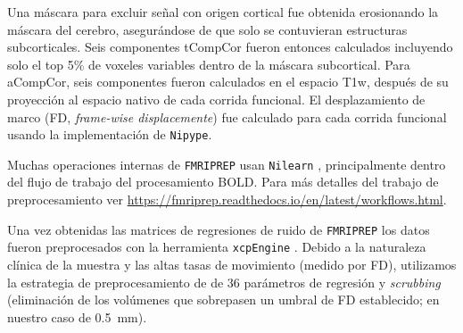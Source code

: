 Una máscara para excluir señal con origen cortical fue obtenida erosionando la máscara del cerebro, asegurándose de que solo se contuvieran estructuras subcorticales.
Seis componentes tCompCor fueron entonces calculados incluyendo solo el top 5\% de voxeles variables dentro de la máscara subcortical.
Para aCompCor, seis componentes fueron calculados en el espacio T1w, después de su proyección al espacio nativo de cada corrida funcional.
El desplazamiento de marco (FD, \textit{frame-wise displacemente}) \parencite{Power2014} fue calculado para cada corrida funcional usando la implementación de \texttt{Nipype}.\par
Muchas operaciones internas de \texttt{FMRIPREP} usan \texttt{Nilearn} \parencite{Abraham2014}, principalmente dentro del flujo de trabajo del procesamiento BOLD. Para más detalles del trabajo de preprocesamiento ver \url{https://fmriprep.readthedocs.io/en/latest/workflows.html}.\par
Una vez obtenidas las matrices de regresiones de ruido de \texttt{FMRIPREP} los datos fueron preprocesados con la herramienta \texttt{xcpEngine} \parencite{Ciric2017}.
Debido a la naturaleza clínica de la muestra y las altas tasas de movimiento (medido por FD), utilizamos la estrategia de preprocesamiento de \textcite{Power2014} de 36 parámetros de regresión y \textit{scrubbing} (eliminación de los volúmenes que sobrepasen un umbral de FD establecido; en nuestro caso de \SI{0.5}{\milli\meter}).

